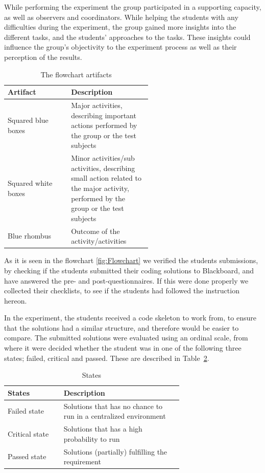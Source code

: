 \documentclass{sig-alternate-05-2015}
\begin{document}
While performing the experiment the group participated in a supporting capacity, as well as observers and coordinators. While helping the students with any difficulties during the experiment, the group gained more insights into the different tasks, and the students' approaches to the tasks. These insights could influence the group's objectivity to the experiment process as well as their perception of the results.\begin{table}[!ht]
\centering
\caption{The flowchart artifacts}
\label{tab:The flowchart artifacts:}
\begin{tabular}{|l|p{0.56\linewidth}|}
\hline
\textbf{Artifact} & \textbf{Description} \\
\hline
\hline
Squared blue boxes & Major activities, describing important actions performed by the group or the test subjects\\
Squared white boxes & Minor activities/sub activities, describing small action related to the major activity, performed by the group or the test subjects\\
Blue rhombus & Outcome of the activity/activities\\
\hline
\end{tabular}
\end{table}
\clearpage

As it is seen in the flowchart \ref{fig:Flowchart} we verified the students submissions, by checking if the students submitted their coding solutions to Blackboard, and have answered the pre- and post-questionnaires. If this were done properly we collected their checklists, to see if the students had followed the instruction hereon.

In the experiment, the students received a code skeleton to work from, to ensure that the solutions had a similar structure, and therefore would be easier to compare. The submitted solutions were evaluated using an ordinal scale, from where it were decided whether the student was in one of the following three states; failed, critical and passed. These are described in Table~\ref{StatesTable}.

\begin{table}[!ht]
\centering
\caption{States}
\label{StatesTable}
\begin{tabular}{|l|p{0.68\linewidth}|}
\hline
\textbf{States} & \textbf{Description} \\
\hline
\hline
Failed state & Solutions that has no chance to run in a centralized environment \\
Critical state & Solutions that has a high probability to run \\
Passed state & Solutions (partially) fulfilling the requirement \\
\hline
\end{tabular}
\end{table}
\end{document}
